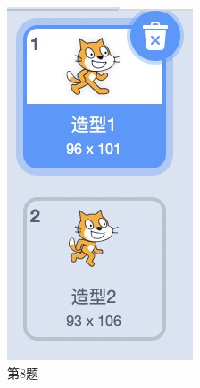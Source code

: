 \documentclass[10pt, a4paper]{article}
\begin{document}
\begin{enumerate}
\begin{figure}[htbp]
\begin{minipage}[t]{.48\textwidth}
\begin{minipage}{.28\textwidth}
                \end{minipage}
                \caption*{第8题}
            \end{minipage}
            \begin{minipage}[t]{.48\textwidth}
                \centering
                \begin{minipage}{.3\textwidth}
                    \centering
                    \includegraphics[width=\textwidth]{10-1.png}

\end{minipage}
\end{minipage}
\end{figure}
\end{enumerate}
\end{document}
